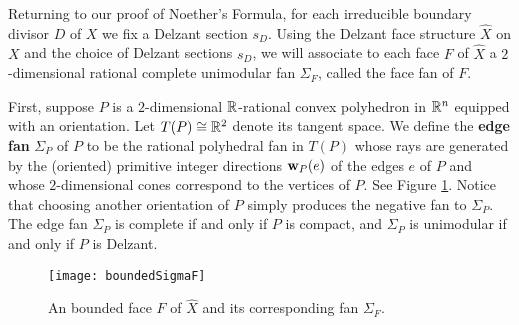 Returning to our proof of Noether's Formula, for each irreducible boundary divisor $D$ of $X$ we fix a Delzant section $s_D$.
Using the Delzant face structure $\hat X$ on $X$ and the choice of Delzant sections $s_D$, 
we will associate to each face $F$ of $\hat X$ a $2$-dimensional rational complete unimodular fan $\Sigma_F$, called the {\rm face fan} of $F$.
  
First, suppose $P$ is a $2$-dimensional ${\mathbb R}$-rational convex polyhedron in $\mathbb{R}^n$ equipped with an orientation. Let $T(P) \cong \mathbb{R}^2$ denote its tangent space. We define the {\bf edge fan}  $\Sigma_P$ of $P$ to be the  rational polyhedral fan in $T(P)$ whose rays are generated by the (oriented) primitive integer directions $\mathbf w_P(e)$ of the edges $e$ of $P$ and whose $2$-dimensional cones correspond to the vertices of $P$. See Figure \ref{fig:boundedSigmaF}. 
Notice that choosing another orientation of $P$ simply produces the negative fan to ${\Sigma}_P$. The edge fan ${\Sigma}_P$ is complete if and only if $P$ is compact, and ${\Sigma}_P$ is unimodular if and only if $P$ is Delzant. 

\begin{figure}
\texttt{[image: boundedSigmaF]} 
\caption{An bounded face $F$ of $\hat{X}$ and its corresponding fan $\Sigma_F$.}
\label{fig:boundedSigmaF}
\end{figure}

